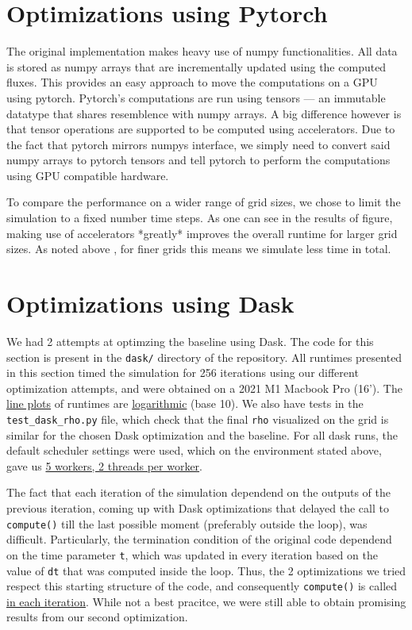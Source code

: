 \documentclass[a4paper,10pt]{article}
\begin{document}
\section{Optimizations using Pytorch}
The original implementation makes heavy use of numpy functionalities.
All data is stored as numpy arrays that are incrementally updated using the computed fluxes.
This provides an easy approach to move the computations on a GPU using pytorch.
Pytorch's computations are run using tensors --- an immutable datatype that shares resemblence with numpy arrays.
A big difference however is that tensor operations are supported to be computed using accelerators.
Due to the fact that pytorch mirrors numpys interface, we simply need to convert said numpy arrays to pytorch tensors
and tell pytorch to perform the computations using GPU compatible hardware.

To compare the performance on a wider range of grid sizes, we chose to limit the simulation to a fixed number time steps.
As one can see in the results of figure, making use of accelerators *greatly* improves the overall runtime for larger grid sizes.
As noted above , for finer grids this means we simulate less time in total.

\section{Optimizations using Dask}
We had 2 attempts at optimzing the baseline using Dask. The code for this section is present in the \verb|dask/| directory of the repository.  All runtimes presented in this section timed the simulation for 256 iterations using our different optimization attempts, and were obtained on a 2021 M1 Macbook Pro (16'). The \underline{line plots} of runtimes are \underline{logarithmic} (base 10). We also have tests in the \verb|test_dask_rho.py| file, which check that the final \verb|rho| visualized on the grid is similar for the chosen Dask optimization and the baseline. For all dask runs, the default scheduler settings were used, which on the environment stated above, gave us \underline{5 workers, 2 threads per worker}.

The fact that each iteration of the simulation dependend on the outputs of the previous iteration, coming up with Dask optimizations that delayed the call to \verb|compute()| till the last possible moment (preferably outside the loop), was difficult. Particularly, the termination condition of the original code dependend on the time parameter \verb|t|, which was updated in every iteration based on the value of \verb|dt| that was computed inside the loop. Thus, the 2 optimizations we tried respect this starting structure of the code, and consequently \verb|compute()| is called \underline{in each iteration}. While not a best pracitce, we were still able to obtain promising results from our second optimization.
\end{document}
